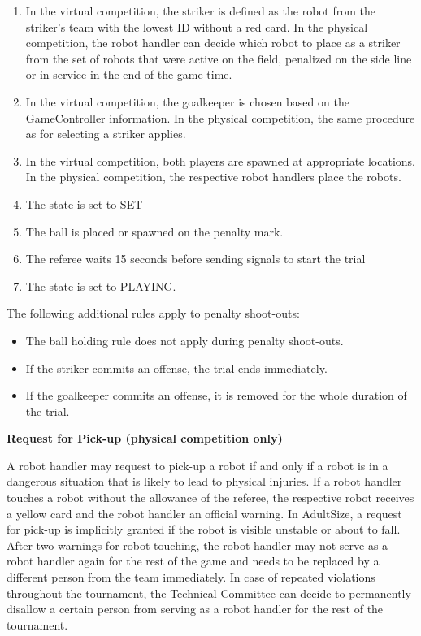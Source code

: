 \begin{enumerate}
\item In the virtual competition, the striker is defined as the robot from the striker's team with the
  lowest ID without a red card. In the physical competition, the robot handler can decide which robot to place as a striker from the set of robots that were active on the field, penalized on the side line or in service in the end of the game time.
\item In the virtual competition, the goalkeeper is chosen based on the GameController information. In the physical competition, the same procedure as for selecting a striker applies.
\item In the virtual competition, both players are spawned at appropriate locations. In the physical competition, the respective robot handlers place the robots.
\item The state is set to SET
\item The ball is placed or spawned on the penalty mark.
\item The referee waits 15 seconds before sending signals to start the trial
\item The state is set to PLAYING.
\end{enumerate}

The following additional rules apply to penalty shoot-outs:

\begin{itemize}
\item The ball holding rule does not apply during penalty shoot-outs.
\item If the striker commits an offense, the trial ends immediately.
\item If the goalkeeper commits an offense, it is removed for the whole duration
  of the trial.
\end{itemize}

\bigskip

{\bfseries Request for Pick-up (physical competition only)}

A robot handler may request to pick-up a robot if and only if a robot is in a
dangerous situation that is likely to lead to physical injuries.
If a robot handler touches a robot without the allowance of the referee,
the respective robot receives a yellow card and the robot handler an official warning.
In AdultSize, a request for pick-up is implicitly granted if the robot is
visible unstable or about to fall.
After two warnings for robot touching, the robot handler may not serve as a
robot handler again for the rest of the game and needs to be replaced by a
different person from the team immediately.
In case of repeated violations throughout the tournament, the Technical
Committee can decide to permanently disallow a certain person from serving as
a robot handler for the rest of the tournament.


